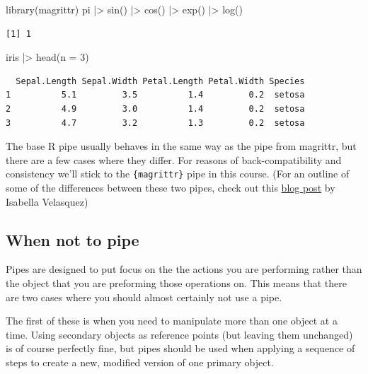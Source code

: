 \documentclass[
  letterpaper,
  DIV=11,
  numbers=noendperiod]{scrreprt}
\newenvironment{Shaded}{\begin{snugshade}}{\end{snugshade}}
\newcommand{\AttributeTok}[1]{\textcolor[rgb]{0.40,0.45,0.13}{#1}}
\newcommand{\DecValTok}[1]{\textcolor[rgb]{0.68,0.00,0.00}{#1}}
\newcommand{\FunctionTok}[1]{\textcolor[rgb]{0.28,0.35,0.67}{#1}}
\newcommand{\NormalTok}[1]{\textcolor[rgb]{0.00,0.23,0.31}{#1}}
\newcommand{\SpecialCharTok}[1]{\textcolor[rgb]{0.37,0.37,0.37}{#1}}
\begin{document}
\begin{Shaded}
\begin{Highlighting}[]
\FunctionTok{library}\NormalTok{(magrittr)}
\NormalTok{pi }\SpecialCharTok{|\textgreater{}} 
  \FunctionTok{sin}\NormalTok{() }\SpecialCharTok{|\textgreater{}} 
  \FunctionTok{cos}\NormalTok{() }\SpecialCharTok{|\textgreater{}} 
  \FunctionTok{exp}\NormalTok{() }\SpecialCharTok{|\textgreater{}} 
  \FunctionTok{log}\NormalTok{()}
\end{Highlighting}
\end{Shaded}

\begin{verbatim}
[1] 1
\end{verbatim}

\begin{Shaded}
\begin{Highlighting}[]
\NormalTok{iris }\SpecialCharTok{|\textgreater{}} 
  \FunctionTok{head}\NormalTok{(}\AttributeTok{n =} \DecValTok{3}\NormalTok{)}
\end{Highlighting}
\end{Shaded}

\begin{verbatim}
  Sepal.Length Sepal.Width Petal.Length Petal.Width Species
1          5.1         3.5          1.4         0.2  setosa
2          4.9         3.0          1.4         0.2  setosa
3          4.7         3.2          1.3         0.2  setosa
\end{verbatim}

The base R pipe usually behaves in the same way as the pipe from
magrittr, but there are a few cases where they differ. For reasons of
back-compatibility and consistency we'll stick to the
\texttt{\{magrittr\}} pipe in this course. (For an outline of some of
the differences between these two pipes, check out this
\href{https://ivelasq.rbind.io/blog/understanding-the-r-pipe/}{blog
post} by Isabella Velasquez)

\subsection{When not to pipe}\label{when-not-to-pipe}

Pipes are designed to put focus on the the actions you are performing
rather than the object that you are preforming those operations on. This
means that there are two cases where you should almost certainly not use
a pipe.

The first of these is when you need to manipulate more than one object
at a time. Using secondary objects as reference points (but leaving them
unchanged) is of course perfectly fine, but pipes should be used when
applying a sequence of steps to create a new, modified version of one
primary object.
\end{document}

